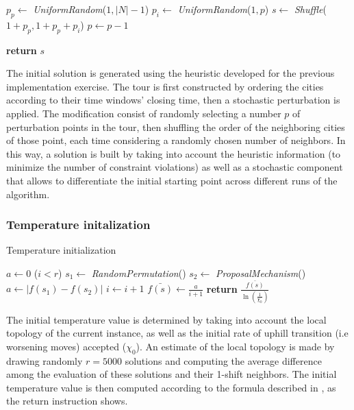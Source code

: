 \begin{homeworkProblem}
\begin{algorithm}
\begin{algorithmic}
  \State $p_p \gets$ \emph{UniformRandom}($1,|N|-1$) 
  \State $p_i \gets$ \emph{UniformRandom}($1,p$) 
  \State $s \gets$ \emph{Shuffle}($1+p_p,1+p_p+p_i$) 
  \State $p \gets p-1$
\EndWhile	

\State \textbf{return} $s$

\EndProcedure    
\end{algorithmic}
\end{algorithm}

The initial solution is generated using the heuristic developed for the previous implementation exercise.
The tour is first constructed by ordering the cities according to their time windows' closing time, then a stochastic perturbation is applied.
The modification consist of randomly selecting a number $p$ of perturbation points in the tour, then shuffling the order of the neighboring cities of those point, each time considering a randomly chosen number of neighbors.
In this way, a solution is built by taking into account the heuristic information (to minimize the number of constraint violations) as well as a stochastic component that allows to differentiate the initial starting point across different runs of the algorithm.

\subsubsection{Temperature initalization}
\begin{algorithm}
\caption{Temperature initialization}
\label{saTInit}
\begin{algorithmic}
  \State $a \gets 0$
  \While($i < r$)
    \State $s_1 \gets$ \emph{RandomPermutation}()
    \State $s_2 \gets$ \emph{ProposalMechanism}()
    \State $a \gets |f(s_1)-f(s_2)|$
    \State $i \gets i + 1$
  \EndWhile
  \State $\bar{f(s)} \gets \frac{a}{i+1}$
  \State \textbf{return} $\frac{\bar{f(s)}}{\ln(\frac{1}{\chi_0})}$
\EndProcedure
\end{algorithmic}
\end{algorithm}

The initial temperature value is determined by taking into account the local topology of the current instance, as well as the initial rate of uphill transition (i.e worsening moves) accepted ($\chi_0$).
An estimate of the local topology is made by drawing randomly $r=5000$ solutions and computing the average difference among the evaluation of these solutions and their 1-shift neighbors.
The initial temperature value is then computed according to the formula described in \cite{ohlmann2007compressed}, as the return instruction shows.


\end{homeworkProblem}
